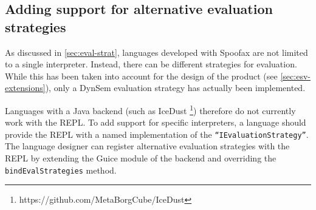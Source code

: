 \subsection{Adding support for alternative evaluation strategies}
\label{ssec:discuss-alternate-eval}

As discussed in \cref{sec:eval-strat}, languages developed with Spoofax are not
limited to a single interpreter. Instead, there can be different strategies for
evaluation. While this has been taken into account for the design of the
product (see \cref{sec:esv-extensions}), only a DynSem evaluation strategy has
actually been implemented.

Languages with a Java backend (such as IceDust%
\footnote{https://github.com/MetaBorgCube/IceDust}) therefore do not currently
work with the REPL. To add support for specific interpreters, a language should
provide the REPL with a named implementation of the
\texttt{``IEvaluationStrategy''}. The language designer can register alternative
evaluation strategies with the REPL by extending the Guice module of the backend
and overriding the \texttt{bindEvalStrategies} method.
